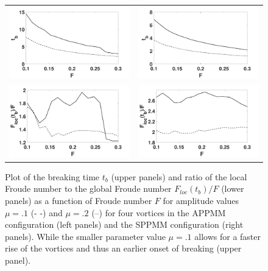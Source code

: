 \documentclass[a4paper,11pt]{article}
\begin{document}
\begin{figure}[!h]
\centering
\begin{tabular}{cc}
\includegraphics[width=.5\textwidth]{froude_comp_ppmm} & \includegraphics[width=.5\textwidth]{froude_comp_ppmm_sym}\\
\includegraphics[width=.5\textwidth]{froude_loc_ppmm} & \includegraphics[width=.5\textwidth]{froude_loc_ppmm_sym}
\end{tabular}
\caption{Plot of the breaking time $t_{b}$ (upper panels) and ratio of the local Froude number to the global Froude number $F_{loc}(t_{b})/F$ (lower panels) as a function of Froude number $F$ for amplitude values $\mu=.1$ (- -) and $\mu=.2$ (--) for four vortices in the APPMM configuration (left panels) and the SPPMM configuration (right panels). While the smaller parameter value $\mu=.1$ allows for a faster rise of the vortices and thus an earlier onset of breaking (upper panel).}
\label{fig:froudecomp_ppmm}
\end{figure}
\end{document}

